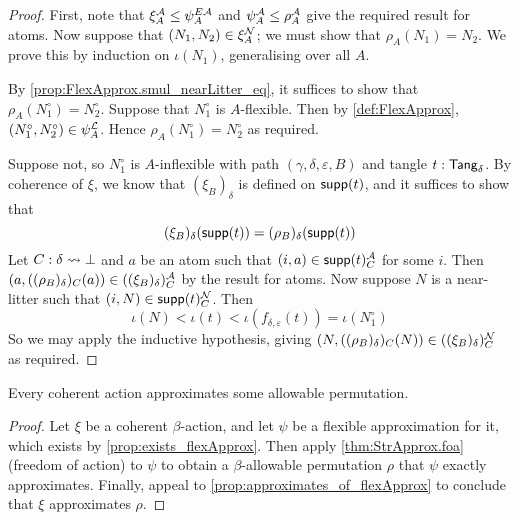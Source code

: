 \begin{proof}
  First, note that \( \xi_A^{\mathcal A} \leq \psi_A^{E{\mathcal A}} \) and \( \psi_A^{\mathcal A} \leq \rho_A^{\mathcal A} \) give the required result for atoms.
  Now suppose that \( (N_1, N_2) \in \xi_A^{\mathcal N} \); we must show that \( \rho_A(N_1) = N_2 \).
  We prove this by induction on \( \iota(N_1) \), generalising over all \( A \).

  By \cref{prop:FlexApprox.smul_nearLitter_eq}, it suffices to show that \( \rho_A(N_1^\circ) = N_2^\circ \).
  Suppose that \( N_1^\circ \) is \( A \)-flexible.
  Then by \cref{def:FlexApprox}, \( (N_1^\circ, N_2^\circ) \in \psi_A^{\mathcal L} \).
  Hence \( \rho_A(N_1^\circ) = N_2^\circ \) as required.

  Suppose not, so \( N_1^\circ \) is \( A \)-inflexible with path \( (\gamma,\delta,\varepsilon,B) \) and tangle \( t : \mathsf{Tang}_\delta \).
  By coherence of \( \xi \), we know that \( (\xi_B)_\delta \) is defined on \( \operatorname{\mathsf{supp}}(t) \), and it suffices to show that
  \[ (\xi_B)_\delta(\operatorname{\mathsf{supp}}(t)) = (\rho_B)_\delta(\operatorname{\mathsf{supp}}(t)) \]
  Let \( C : \delta \rightsquigarrow \bot \) and \( a \) be an atom such that \( (i, a) \in \operatorname{\mathsf{supp}}(t)_C^{\mathcal A} \) for some \( i \).
  Then \( (a, ((\rho_B)_\delta)_C(a)) \in ((\xi_B)_\delta)_C^{\mathcal A} \) by the result for atoms.
  Now suppose \( N \) is a near-litter such that \( (i, N) \in \operatorname{\mathsf{supp}}(t)_C^{\mathcal N} \).
  Then
  \[ \iota(N) < \iota(t) < \iota(f_{\delta,\varepsilon}(t)) = \iota(N_1^\circ) \]
  So we may apply the inductive hypothesis, giving \( (N, ((\rho_B)_\delta)_C(N)) \in ((\xi_B)_\delta)_C^{\mathcal N} \) as required.
\end{proof}
\begin{theorem}
  \label{thm:StrAction.foa}
  Every coherent action approximates some allowable permutation.
\end{theorem}
\begin{proof}
  Let \( \xi \) be a coherent \( \beta \)-action, and let \( \psi \) be a flexible approximation for it, which exists by \cref{prop:exists_flexApprox}.
  Then apply \cref{thm:StrApprox.foa} (freedom of action) to \( \psi \) to obtain a \( \beta \)-allowable permutation \( \rho \) that \( \psi \) exactly approximates.
  Finally, appeal to \cref{prop:approximates_of_flexApprox} to conclude that \( \xi \) approximates \( \rho \).
\end{proof}
